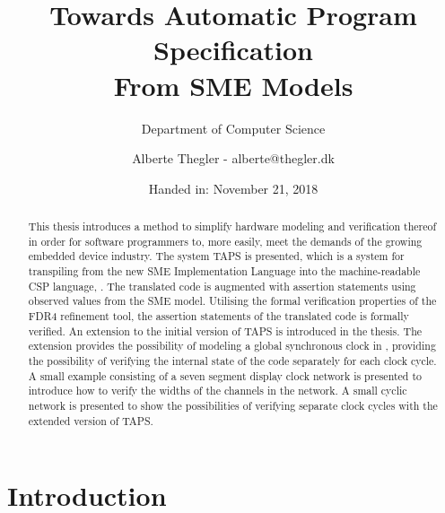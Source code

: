 \documentclass[a4paper]{report}
\author{Alberte Thegler - alberte@thegler.dk}
\title{Towards Automatic Program Specification \\ From SME Models}
\subtitle{Department of Computer Science}
\date{Handed in: November 21, 2018}
\begin{document}
\maketitle



\begin{abstract}
\begin{doublespace}
This thesis introduces a method to simplify hardware modeling and verification
thereof in order for software programmers to, more easily, meet the demands of
the growing embedded device industry. The system TAPS is presented, which is a
system for transpiling from the new SME Implementation Language into the
machine-readable CSP language, \cspm{}.
The translated \cspm{} code is augmented with assertion statements using
observed values from the SME model. Utilising the formal verification
properties of the FDR4 refinement tool, the assertion statements of the
translated \cspm{} code is formally verified.
An extension to the initial version of TAPS is introduced in the thesis. The extension provides the possibility of modeling a global synchronous clock in
\cspm{}, providing the possibility of verifying the internal state of the
\cspm{} code separately for each clock cycle.
A small example consisting of a
seven segment display clock network is presented to introduce how to verify the
widths of the channels in the network. A small cyclic network is presented to
show the possibilities of verifying separate clock cycles with the extended
version of TAPS.
\end{doublespace}
\end{abstract}


\newpage
\tableofcontents

\newpage
{}



\chapter{Introduction}

%
% 
\end{document}

